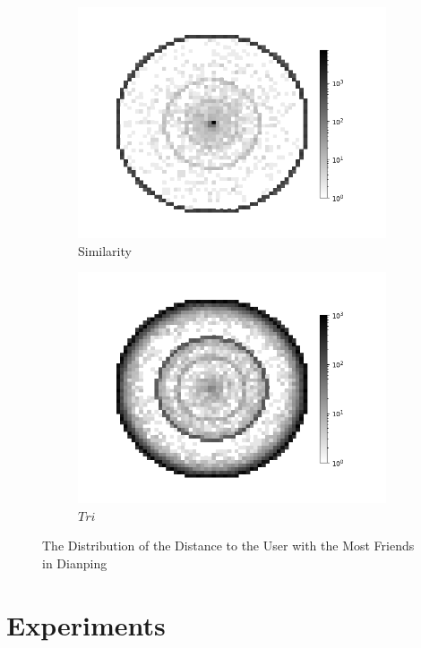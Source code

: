 \documentclass{article}
\begin{document}
\begin{figure}[h]    
  \centering
  \begin{subfigure}{0.4\textwidth}
    \centering
      \includegraphics[width=1\linewidth]{pic/figure4_1.png}
    \caption{Similarity}
  \end{subfigure}%
  \begin{subfigure}{0.4\textwidth}
  \centering
      \includegraphics[width=1\linewidth]{pic/figure4_2.png}
    \caption{$Tri$}
  \end{subfigure}%
\caption{The Distribution of the Distance to the User with the Most Friends in Dianping}
\end{figure}
\section{Experiments}
\label{experiments}
\end{document}
